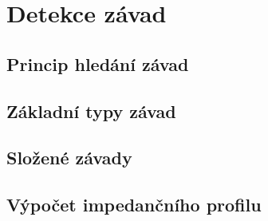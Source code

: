 \chapter{Detekce závad}

\section{Princip hledání závad}

\section{Základní typy závad}

\section{Složené závady}

\section{Výpočet impedančního profilu}
